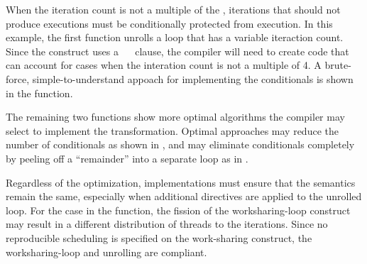
When the iteration count is not a multiple of the ,
iterations that should not produce executions must be conditionally
protected from execution. In this example, the first function
unrolls a loop that has a variable iteraction count. Since the 
construct uses a ~~\code{)} clause, the compiler will need to
create code that can account for cases when the interation count is not a
multiple of 4. A brute-force, simple-to-understand appoach for implementing 
the conditionals is shown in the  function.

The remaining two functions show more optimal algorithms the compiler 
may select to implement the transformation.
Optimal approaches may reduce the number of conditionals as shown in 
, and 
may eliminate conditionals completely by peeling off a ``remainder'' 
into a separate loop as in . 

Regardless of the optimization, implementations must ensure that the semantics
remain the same, especially when additional directives are applied to
the unrolled loop. For the case in the 
function, the fission of the worksharing-loop construct may result in a different
distribution of threads to the iterations. Since no reproducible scheduling
is specified on the work-sharing construct, the worksharing-loop and unrolling are compliant.

